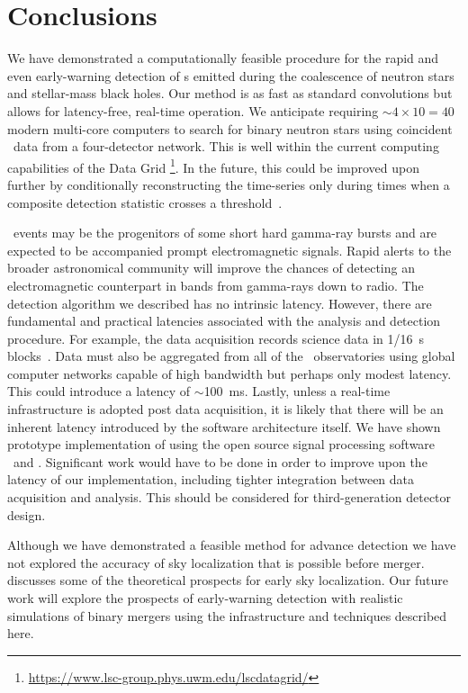 \section{Conclusions}
\label{sec:conclusions}

We have demonstrated a computationally feasible procedure for the rapid and
even early-warning detection of \GW{}s emitted during the coalescence
of neutron stars and stellar-mass black holes. Our method is as fast as
standard \fft{} convolutions but allows for latency-free, real-time
operation.  We anticipate requiring $\sim 4 \times 10 = 40$ modern multi-core computers to
search for binary neutron stars using coincident \GW\ data from a four-detector network.
This is well within the current computing capabilities of the \LIGO{} Data Grid%
\footnote{\url{https://www.lsc-group.phys.uwm.edu/lscdatagrid/}}. In the future, this
could be improved upon further by conditionally reconstructing the \SNR{} time-series
only during times when a composite detection statistic crosses a
threshold~\citep{svd-compdetstat}.

\CBC\ events may be the progenitors of some short hard gamma-ray bursts and are
expected to be accompanied prompt electromagnetic signals.  Rapid
alerts to the broader astronomical community will improve the chances of
detecting an electromagnetic counterpart in bands from gamma-rays down to
radio.  The detection algorithm we described has no intrinsic latency.  However, there are
fundamental and practical latencies associated with the analysis and detection
procedure. For example, the \LIGO{} data acquisition records science data in 1/16~s
blocks~\citep{Bork2001}. Data must also be aggregated from all of the \GW\
observatories using global computer networks capable of high bandwidth but perhaps only
modest latency.  This could introduce a latency of $\sim$100~ms.  Lastly, unless a
real-time infrastructure is adopted post data acquisition, it is likely that there will be 
an inherent latency introduced by the software architecture itself.  We have shown 
prototype implementation of \lloid{} using the open source signal processing software
\gstreamer\ and \gstlal. Significant work would have to be done in order to
improve upon the latency of our implementation, including tighter integration between
data acquisition and analysis. This should be considered for third-generation detector
design.

Although we have demonstrated a feasible method for advance detection we have
not explored the accuracy of sky localization that is possible before merger.
\citet{Fairhurst2009} discusses some of the theoretical prospects for early
sky localization.  Our future work will explore the prospects of early-warning
detection with realistic simulations of binary mergers using the infrastructure
and techniques described here. 

